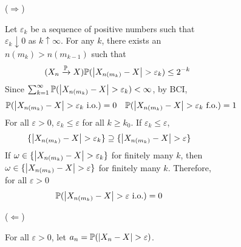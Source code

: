 \documentclass{huhtakm-template-book}
\newcommand{\prob}{\mathbb{P}}
\begin{document}
    \begin{proofing}
        \begin{figure}[h!]
            \begin{subfigure}[b]{0.05\textwidth}
                ($\Longrightarrow$)
            \end{subfigure}
            \begin{subfigure}[t]{0.9\textwidth}
                Let $\varepsilon_{k}$ be a sequence of positive numbers such that $\varepsilon_{k}\downarrow 0$ as $k\uparrow\infty$. For any $k$, there exists an $n(m_{k})>n(m_{k-1})$ such that
                \begin{equation*}
                    \tag{$X_{n}\xrightarrow{\prob}X$}
                    \prob(\abs{X_{n(m_{k})}-X}>\varepsilon_{k})\leq 2^{-k}
                \end{equation*}
                Since $\sum_{k=1}^{\infty}\prob(\abs{X_{n(m_{k})}-X}>\varepsilon_{k})<\infty$, by BCI,
                \begin{align*}
                    \prob(\abs{X_{n(m_{k})}-X}>\varepsilon_{k}\text{ i.o.})&=0 & \prob(\abs{X_{n(m_{k})}-X}>\varepsilon_{k}\text{ f.o.})&=1
                \end{align*}
                For all $\varepsilon>0$, $\varepsilon_{k}\leq\varepsilon$ for all $k\geq k_{0}$. If $\varepsilon_{k}\leq\varepsilon$,
                \begin{equation*}
                    \{\abs{X_{n(m_{k})}-X}>\varepsilon_{k}\}\supseteq\{\abs{X_{n(m_{k})}-X}>\varepsilon\}
                \end{equation*}
                If $\omega\in\{\abs{X_{n(m_{k})}-X}>\varepsilon_{k}\}$ for finitely many $k$, then $\omega\in\{\abs{X_{n(m_{k})}-X}>\varepsilon\}$ for finitely many $k$. Therefore, for all $\varepsilon >0$
                \begin{equation*}
                    \prob(\abs{X_{n(m_{k})}-X}>\varepsilon\text{ i.o.})=0
                \end{equation*}
            \end{subfigure}
        \end{figure}
        \begin{figure}[h!]
            \begin{subfigure}[b]{0.05\textwidth}
                ($\Longleftarrow$)
            \end{subfigure}
            \begin{subfigure}[t]{0.9\textwidth}
                For all $\varepsilon>0$, let $a_{n}=\prob(\abs{X_{n}-X}>\varepsilon)$.\\

\end{subfigure}
\end{figure}
\end{proofing}
\end{document}
